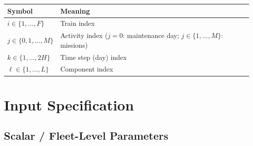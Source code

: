 \documentclass[11pt,a4paper]{article}
\begin{document}
\begin{longtable}{@{}lp{10cm}@{}}
\toprule
Symbol & Meaning \\
\midrule
$i \in \{1,\ldots,F\}$ & Train index \\
$j \in \{0,1,\ldots,M\}$ & Activity index ($j=0$: maintenance day; $j \in \{1,\ldots,M\}$: missions) \\
$k \in \{1,\ldots,2H\}$ & Time step (day) index \\
$\ell \in \{1,\ldots,L\}$ & Component index \\
\bottomrule
\end{longtable}

\section{Input Specification}

\subsection{Scalar / Fleet-Level Parameters}
\end{document}
